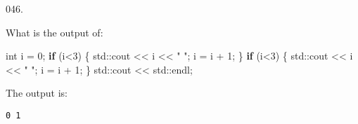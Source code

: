 \documentclass[]{book}
\newenvironment{Shaded}{}{}
\newcommand{\BuiltInTok}[1]{#1}
\newcommand{\ControlFlowTok}[1]{\textcolor[rgb]{0.00,0.44,0.13}{\textbf{#1}}}
\newcommand{\DataTypeTok}[1]{\textcolor[rgb]{0.56,0.13,0.00}{#1}}
\newcommand{\DecValTok}[1]{\textcolor[rgb]{0.25,0.63,0.44}{#1}}
\newcommand{\NormalTok}[1]{#1}
\newcommand{\StringTok}[1]{\textcolor[rgb]{0.25,0.44,0.63}{#1}}
\begin{document}
\vspace{2mm}\noindent\hrulefill{}

\begin{minipage}{\linewidth}\noindent
{\tiny 046.}\\
\begin{minipage}[t]{.485\linewidth}

What is the output of:

\begin{framed}

\begin{Shaded}
\begin{Highlighting}[]
\DataTypeTok{int}\NormalTok{ i = }\DecValTok{0}\NormalTok{;}
\ControlFlowTok{if}\NormalTok{ (i<}\DecValTok{3}\NormalTok{) \{}
  \BuiltInTok{std::}\NormalTok{cout << i << }\StringTok{" "}\NormalTok{;}
\NormalTok{  i = i + }\DecValTok{1}\NormalTok{;}
\NormalTok{\}}
\ControlFlowTok{if}\NormalTok{ (i<}\DecValTok{3}\NormalTok{) \{}
  \BuiltInTok{std::}\NormalTok{cout << i << }\StringTok{" "}\NormalTok{;}
\NormalTok{  i = i + }\DecValTok{1}\NormalTok{;}
\NormalTok{\}}
\BuiltInTok{std::}\NormalTok{cout << }\BuiltInTok{std::}\NormalTok{endl;}
\end{Highlighting}
\end{Shaded}

\end{framed}

\end{minipage}
\hfill
\begin{minipage}[t]{.485\linewidth}

The output is:

\begin{framed}

\begin{verbatim}
0 1 
\end{verbatim}

\end{framed}

\end{minipage}
\end{minipage}

\vspace{2mm}\noindent\hrulefill{}
\end{document}
